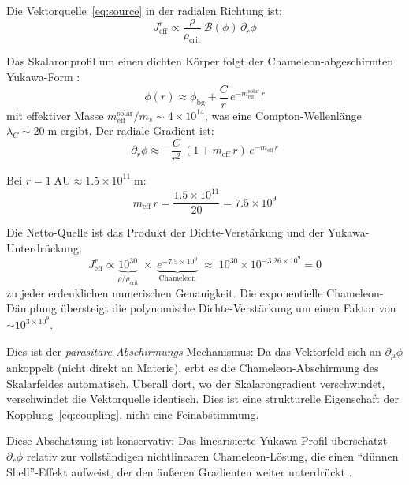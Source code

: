 \documentclass[aps,prd,twocolumn,superscriptaddress,nofootinbib]{revtex4-2}
\begin{document}
Die Vektorquelle~\eqref{eq:source} in der radialen Richtung ist:
\begin{equation}
J^r_{\mathrm{eff}} \propto \frac{\rho}{\rho_{\mathrm{crit}}}\,\mathcal{B}(\phi)\,\partial_r\phi
\end{equation}

Das Skalaronprofil um einen dichten K\"orper folgt der Chameleon-abgeschirmten Yukawa-Form \cite{Geiger2026c}:
\begin{equation}
\phi(r) \approx \phi_{\mathrm{bg}} + \frac{C}{r}\,e^{-m_{\mathrm{eff}}^{\mathrm{solar}}\,r}
\end{equation}
mit effektiver Masse $m_{\mathrm{eff}}^{\mathrm{solar}}/m_s \sim 4 \times 10^{14}$, was eine Compton-Wellenl\"ange $\lambda_C \sim 20\;\mathrm{m}$ ergibt. Der radiale Gradient ist:
\begin{equation}
\partial_r\phi \approx -\frac{C}{r^2}\,(1 + m_{\mathrm{eff}}\,r)\,e^{-m_{\mathrm{eff}}\,r}
\end{equation}

Bei $r = 1\;\mathrm{AU} \approx 1.5 \times 10^{11}\;\mathrm{m}$:
\begin{equation}
m_{\mathrm{eff}}\,r = \frac{1.5 \times 10^{11}}{20} = 7.5 \times 10^9
\end{equation}

Die Netto-Quelle ist das Produkt der Dichte-Verst\"arkung und der Yukawa-Unterdr\"uckung:
\begin{equation}
J^r_{\mathrm{eff}} \propto \underbrace{10^{30}}_{\rho/\rho_{\mathrm{crit}}} \;\times\; \underbrace{e^{-7.5 \times 10^9}}_{\text{Chameleon}} \;\approx\; 10^{30} \times 10^{-3.26 \times 10^9} = 0
\label{eq:parasitic}
\end{equation}
zu jeder erdenklichen numerischen Genauigkeit. Die exponentielle Chameleon-D\"ampfung \"ubersteigt die polynomische Dichte-Verst\"arkung um einen Faktor von $\sim 10^{3 \times 10^9}$.

Dies ist der \textit{parasit\"are Abschirmungs}-Mechanismus: Da das Vektorfeld sich an $\partial_\mu\phi$ ankoppelt (nicht direkt an Materie), erbt es die Chameleon-Abschirmung des Skalarfeldes automatisch. \"Uberall dort, wo der Skalarongradient verschwindet, verschwindet die Vektorquelle identisch. Dies ist eine strukturelle Eigenschaft der Kopplung~\eqref{eq:coupling}, nicht eine Feinabstimmung.

Diese Absch\"atzung ist konservativ: Das linearisierte Yukawa-Profil \"ubersch\"atzt $\partial_r\phi$ relativ zur vollst\"andigen nichtlinearen Chameleon-L\"osung, die einen ``d\"unnen Shell''-Effekt aufweist, der den \"au\ss{}eren Gradienten weiter unterdr\"uckt \cite{HuSawicki2007}.
\end{document}

